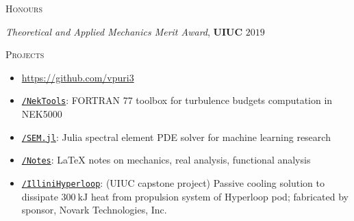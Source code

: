 \documentclass[10pt]{article}
\begin{document}
\vspace{-1.5em}
\begin{multicols}{2}
\textsc{Honours}
\columnbreak

\textit{Theoretical and Applied Mechanics Merit Award}, \textbf{UIUC} \hfill $2019$


\end{multicols}
\vspace{-1.5em}
\begin{multicols}{2}
\textsc{Projects}
\columnbreak

\vspace{-1.75em}
\begin{itemize}[label=-]
    \setlength{\itemindent}{-1.50em}
    \setlength\itemsep{-0.25em}
    \item[]\hspace{-1.00em}\url{https://github.com/vpuri3}
    \item \href{https://github.com/vpuri3/NekTools}{\texttt{/NekTools}}: FORTRAN 77 toolbox for turbulence budgets computation in NEK5000
    \item \href{https://github.com/vpuri3/SEM.jl}{\texttt{/SEM.jl}}: Julia spectral element PDE solver for machine learning research
    \item \href{https://github.com/vpuri3/Notes}{\texttt{/Notes}}: \LaTeX{} notes on mechanics, real analysis, functional analysis
    \item \href{https://github.com/vpuri3/IlliniHyperloop}{\texttt{/IlliniHyperloop}}: (UIUC capstone project) Passive cooling solution to dissipate $\SI{300}{\kilo \joule}$ heat from propulsion system of Hyperloop pod; fabricated by sponsor, Novark Technologies, Inc.
\end{itemize}
\vspace{-2.0em}

\end{multicols}
\vspace{-1.5em}
\vfill
\end{document}
